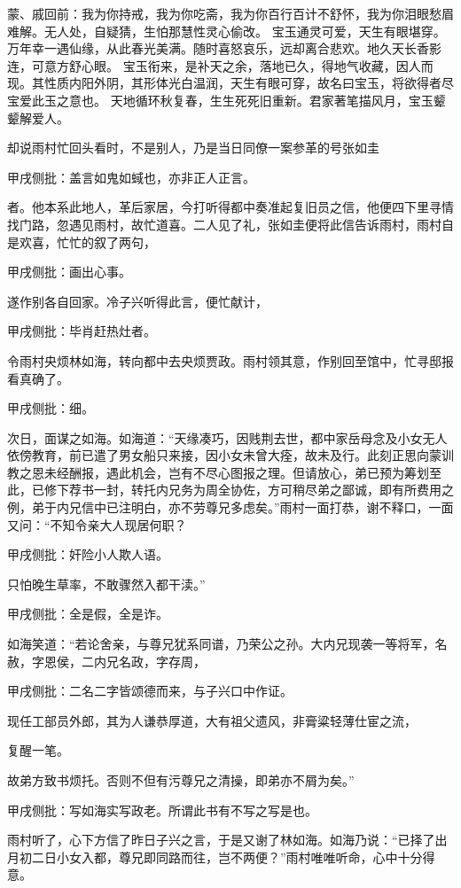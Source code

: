 
\begin{parag}
    \begin{note}蒙、戚回前：我为你持戒，我为你吃斋，我为你百行百计不舒怀，我为你泪眼愁眉难解。无人处，自疑猜，生怕那慧性灵心偷改。
        宝玉通灵可爱，天生有眼堪穿。万年幸一遇仙缘，从此春光美满。随时喜怒哀乐，远却离合悲欢。地久天长香影连，可意方舒心眼。
        宝玉衔来，是补天之余，落地已久，得地气收藏，因人而现。其性质内阳外阴，其形体光白温润，天生有眼可穿，故名曰宝玉，将欲得者尽宝爱此玉之意也。
        天地循环秋复春，生生死死旧重新。君家著笔描风月，宝玉颦颦解爱人。\end{note}
\end{parag}


\begin{parag}
    却说雨村忙回头看时，不是别人，乃是当日同僚一案参革的号张如圭\begin{note}甲戌侧批：盖言如鬼如蜮也，亦非正人正言。\end{note}者。他本系此地人，革后家居，今打听得都中奏准起复旧员之信，他便四下里寻情找门路，忽遇见雨村，故忙道喜。二人见了礼，张如圭便将此信告诉雨村，雨村自是欢喜，忙忙的叙了两句，\begin{note}甲戌侧批：画出心事。\end{note}遂作别各自回家。冷子兴听得此言，便忙献计，\begin{note}甲戌侧批：毕肖赶热灶者。\end{note}令雨村央烦林如海，转向都中去央烦贾政。雨村领其意，作别回至馆中，忙寻邸报看真确了。\begin{note}甲戌侧批：细。\end{note}次日，面谋之如海。如海道：“天缘凑巧，因贱荆去世，都中家岳母念及小女无人依傍教育，前已遣了男女船只来接，因小女未曾大痊，故未及行。此刻正思向蒙训教之恩未经酬报，遇此机会，岂有不尽心图报之理。但请放心，弟已预为筹划至此，已修下荐书一封，转托内兄务为周全协佐，方可稍尽弟之鄙诚，即有所费用之例，弟于内兄信中已注明白，亦不劳尊兄多虑矣。”雨村一面打恭，谢不释口，一面又问：“不知令亲大人现居何职？\begin{note}甲戌侧批：奸险小人欺人语。\end{note}只怕晚生草率，不敢骤然入都干渎。”\begin{note}甲戌侧批：全是假，全是诈。\end{note}如海笑道：“若论舍亲，与尊兄犹系同谱，乃荣公之孙。大内兄现袭一等将军，名赦，字恩侯，二内兄名政，字存周，\begin{note}甲戌侧批：二名二字皆颂德而来，与子兴口中作证。\end{note}现任工部员外郎，其为人谦恭厚道，大有祖父遗风，非膏粱轻薄仕宦之流，\begin{note}复醒一笔。\end{note}故弟方致书烦托。否则不但有污尊兄之清操，即弟亦不屑为矣。”\begin{note}甲戌侧批：写如海实写政老。所谓此书有不写之写是也。\end{note}雨村听了，心下方信了昨日子兴之言，于是又谢了林如海。如海乃说：“已择了出月初二日小女入都，尊兄即同路而往，岂不两便？”雨村唯唯听命，心中十分得意。
\end{parag}


